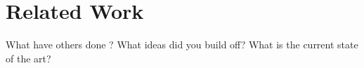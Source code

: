 \section{Related Work}
What have others done ? What ideas did you build off? What is the current state of the art? 

